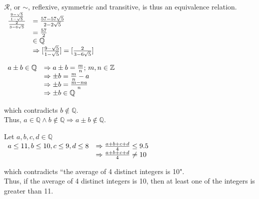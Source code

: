 \documentclass[a4paper, 11pt]{article}
\begin{document}
\begin{myEnumerate}
\begin{myEnumerate}
         $\mathcal{R}$, or $\sim$, reflexive, symmetric and transitive, is thus an equivalence relation. \\
         
         \( \begin{array}{llr}
            	\frac{\frac{9-\sqrt{5}}{1-\sqrt{5}}}{\frac{2}{3-6\sqrt{5}}} & = \frac{57-57\sqrt{5}}{2-2\sqrt{5}} \\
                & =\frac{57}{2} \\
                & \in \mathbb{Q} \\
                & \Rightarrow [\frac{9-\sqrt{5}}{1-\sqrt{5}}]=[\frac{2}{3-6\sqrt{5}}]\\
            \end{array} \\ \)            

    \end{myEnumerate}

    \item
    \begin{myEnumerate}
    	\item
        \( \\ \begin{array}{llr}
            	a\pm b\in \mathbb{Q} & \Rightarrow a\pm b=\frac{m}{n}\textnormal{; }m,n\in \mathbb{Z} \\
                & \Rightarrow \pm b=\frac{m}{n}-a \\
                & \Rightarrow \pm b=\frac{m-na}{n} \\
                & \Rightarrow \pm b\in \mathbb{Q}
            \end{array} \\ \)
        
        which contradicts $b\notin \mathbb{Q}$. \\
        Thus, $a\in \mathbb{Q} \land b\notin \mathbb{Q}\Rightarrow a\pm b\notin \mathbb{Q}$. \\
        
        \item Let $a, b, c, d\in \mathbb{Q}$ \\
        \( \begin{array}{llr}
            	a\leq 11, b\leq 10, c\leq 9, d\leq 8 & \Rightarrow \frac{a+b+c+d}{4}\leq 9.5 \\
                & \Rightarrow \frac{a+b+c+d}{4}\neq 10
            \end{array} \\ \)
        
        which contradicts ``the average of 4 distinct integers is 10". \\
        Thus, if the average of 4 distinct integers is 10, then at least one of the integers is greater than 11.
    \end{myEnumerate}

\end{myEnumerate}
\end{document}
